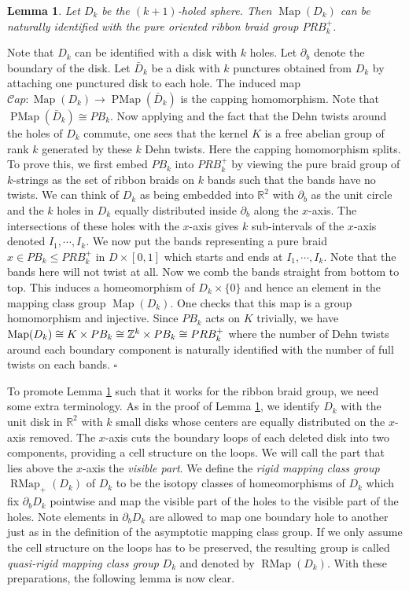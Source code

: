 \documentclass[11pt, a4paper]{amsart}
\newtheorem{lem}[thm]{Lemma}
\theoremstyle{definition}
\newcommand{\CC}{{\mathcal {C}}}
\def\Proof{\noindent{\bf Proof.}\quad}
\def\qed{\hfill$\square$\smallskip}
\DeclareMathOperator{\Map}{Map}
\DeclareMathOperator{\RMap}{RMap}
\DeclareMathOperator{\PMap}{PMap}
\begin{document}
\begin{lem}\label{lem-pbraid-ribb}
Let $D_k$ be the $(k+1)$-holed sphere. Then $\Map(D_k)$ can be naturally identified with the  pure oriented ribbon braid group $PRB_k^+$. 
\end{lem}
\Proof Note that $D_k$ can be identified with a disk with $k$ holes. Let $\partial_b$ denote the boundary of the disk. Let $\bar{D}_k$ be a disk with $k$ punctures obtained from $D_k$ by attaching one punctured disk to each hole. The induced map $\CC ap:\Map(D_k)\to \PMap(\bar{D}_k)$ is the capping homomorphism. Note that $\PMap(\bar{D}_k) \cong PB_k$. Now applying \cite[Proposition 3.19]{FaMa11} and the fact that the Dehn twists around the holes of $D_k$ commute, one sees that the kernel $K$ is a free abelian group of rank $k$ generated by these $k$ Dehn twists.  Here the capping homomorphism splits. To prove this, we first embed $PB_k$ into $PRB_k^+$ by viewing the pure braid group of $k$-strings as the set of ribbon braids on $k$ bands such that the bands have no twists. We can think of $D_k$ as being embedded into $\mathbb{R}^2$ with $\partial_b$ as the unit circle and the $k$ holes in $D_k$ equally distributed inside $\partial_b$ along the $x$-axis. The intersections of these holes with the $x$-axis gives $k$ sub-intervals of the $x$-axis denoted $I_1,\cdots,I_k$.  We now put the bands representing a pure braid $x\in PB_k\leq PRB_k^+$ in $D\times [0,1]$ which starts and ends at $I_1,\cdots,I_k$. Note that the bands here will not twist at all. Now we comb the bands straight from bottom to top.  This induces a homeomorphism of $D_k\times \{0\}$ and hence an element in the mapping class group  $\Map(D_k)$. One checks that this map is a group homomorphism and injective. Since $PB_k$ acts on $K$ trivially, we have $\Map(D_k) \cong K \times PB_k \cong \BZ^k\times PB_k \cong PRB_k^+$ where the number of Dehn twists around each boundary component is naturally identified with the number of full twists on each bands.
\qed

To promote Lemma \ref{lem-pbraid-ribb} such that it works for the ribbon braid group, we need some extra terminology. As in the proof of  Lemma \ref{lem-pbraid-ribb}, we identify $D_k$ with the unit disk in $\mathbb{R}^2$ with $k$ small disks whose centers are equally distributed on the $x$-axis removed. The $x$-axis cuts the boundary loops of each deleted disk into two components, providing a cell structure on the loops. We will call the part that lies above the $x$-axis the \emph{visible part}. We define the \emph{rigid mapping class group} $\RMap_+(D_k)$ of $D_k $ to be the isotopy classes of homeomorphisms of $D_k$ which fix $\partial_b D_k$ pointwise and map the visible part of the holes to the visible part of the holes. Note  elements in $\partial_b D_k$ are allowed to map one boundary hole to another just as in the definition of the asymptotic mapping class group. If we only assume the cell structure on the loops has to be preserved, the resulting group is called \emph{quasi-rigid mapping class group} $D_k$ and denoted by $\RMap(D_k)$. With these preparations, the following lemma is now clear. 
\end{document}
